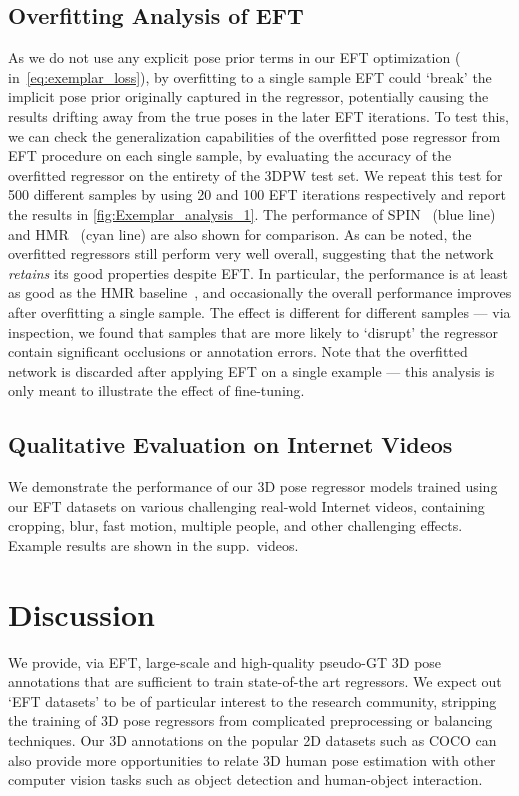 \documentclass[10pt,twocolumn,letterpaper]{article}
\begin{document}
\subsection{Overfitting Analysis of EFT} \label{s:resultoverffing}
As we do not use any explicit pose prior terms in our EFT optimization ( in~\cref{eq:exemplar_loss}), by overfitting to a single sample EFT could `break' the implicit pose prior originally captured in the regressor, potentially causing the results drifting away from the true poses in the later EFT iterations.
	To test this, we can check the generalization capabilities of the overfitted pose regressor from EFT procedure on each single sample, by evaluating the accuracy of the overfitted regressor on the entirety of the 3DPW  test set.
	We repeat this test for 500 different samples by using 20 and 100 EFT iterations respectively and report the results in \cref{fig:Exemplar_analysis_1}.
	The performance of SPIN~\cite{kolotouros2019spin} (blue line) and HMR~\cite{kanazawa2018end} (cyan line) are also shown for comparison.
As can be noted, the overfitted regressors still perform very well overall, suggesting that the network \emph{retains} its good properties despite EFT\@.
	In particular, the performance is at least as good as the HMR baseline~\cite{kanazawa2018end}, and occasionally the overall performance improves after overfitting a single sample.
	The effect is different for different samples --- via inspection, we found that samples that are more likely to `disrupt' the regressor contain significant occlusions or annotation errors. Note that the overfitted network is discarded after applying EFT on a single example  --- this analysis is only meant to illustrate the effect of fine-tuning.

	\subsection{Qualitative Evaluation on Internet Videos}
	We demonstrate the performance of our 3D pose regressor models trained using our EFT datasets on various challenging real-wold Internet videos, containing cropping, blur, fast motion, multiple people, and other challenging effects. Example results are shown in the supp.~videos.
	\section{Discussion}
	
	We provide, via EFT, large-scale and high-quality pseudo-GT 3D pose annotations that are sufficient to train state-of-the art regressors. We expect out `EFT datasets' to be of particular interest to the research community, stripping the training of 3D pose regressors from complicated preprocessing or balancing techniques. Our 3D annotations on the popular 2D datasets such as COCO can also provide more opportunities to relate 3D human pose estimation with other computer vision tasks such as object detection and human-object interaction.
	
\end{document}
